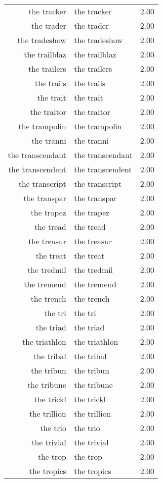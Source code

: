 \begin{table}[ht]
\begin{tabular}{rlr}
  the tracker & the tracker & 2.00 \\ 
  the trader & the trader & 2.00 \\ 
  the tradeshow & the tradeshow & 2.00 \\ 
  the trailblaz & the trailblaz & 2.00 \\ 
  the trailers & the trailers & 2.00 \\ 
  the trails & the trails & 2.00 \\ 
  the trait & the trait & 2.00 \\ 
  the traitor & the traitor & 2.00 \\ 
  the trampolin & the trampolin & 2.00 \\ 
  the tranni & the tranni & 2.00 \\ 
  the transcendant & the transcendant & 2.00 \\ 
  the transcendent & the transcendent & 2.00 \\ 
  the transcript & the transcript & 2.00 \\ 
  the transpar & the transpar & 2.00 \\ 
  the trapez & the trapez & 2.00 \\ 
  the tread & the tread & 2.00 \\ 
  the treasur & the treasur & 2.00 \\ 
  the treat & the treat & 2.00 \\ 
  the tredmil & the tredmil & 2.00 \\ 
  the tremend & the tremend & 2.00 \\ 
  the trench & the trench & 2.00 \\ 
  the tri & the tri & 2.00 \\ 
  the triad & the triad & 2.00 \\ 
  the triathlon & the triathlon & 2.00 \\ 
  the tribal & the tribal & 2.00 \\ 
  the tribun & the tribun & 2.00 \\ 
  the tribune & the tribune & 2.00 \\ 
  the trickl & the trickl & 2.00 \\ 
  the trillion & the trillion & 2.00 \\ 
  the trio & the trio & 2.00 \\ 
  the trivial & the trivial & 2.00 \\ 
  the trop & the trop & 2.00 \\ 
  the tropics & the tropics & 2.00 \\ 

\end{tabular}
\end{table}
